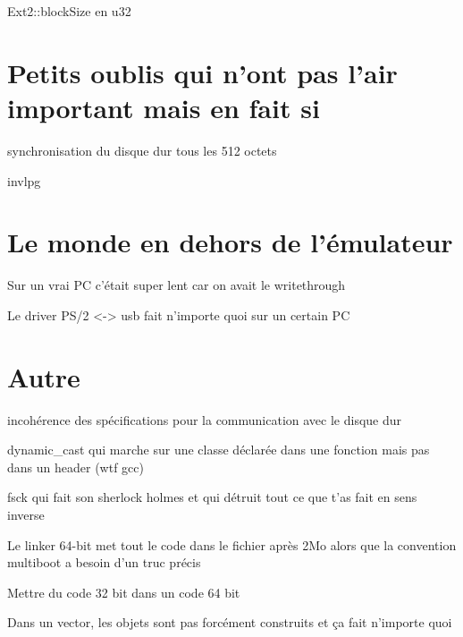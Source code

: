 \documentclass[12pt]{report}
\begin{document}
Ext2::blockSize en u32

\section{Petits oublis qui n'ont pas l'air important mais en fait si}

synchronisation du disque dur tous les 512 octets

invlpg

\section{Le monde en dehors de l'émulateur}

Sur un vrai PC c'était super lent car on avait le writethrough

Le driver PS/2 <-> usb fait n'importe quoi sur un certain PC

\section{Autre}

incohérence des spécifications pour la communication avec le disque dur

dynamic\_cast qui marche sur une classe déclarée dans une fonction mais pas dans un header (wtf gcc)

fsck qui fait son sherlock holmes et qui détruit tout ce que t'as fait en sens inverse

Le linker 64-bit met tout le code dans le fichier après 2Mo alors que la convention multiboot a besoin d'un truc précis

Mettre du code 32 bit dans un code 64 bit

Dans un vector, les objets sont pas forcément construits et ça fait n'importe quoi





\end{document}
